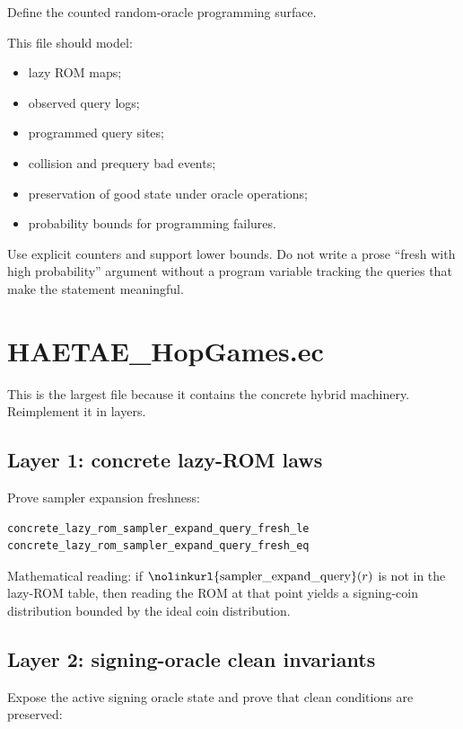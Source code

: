 \documentclass[11pt]{report}
\DeclareRobustCommand{\ec}[1]{\ifmmode\text{\nolinkurl{#1}}\else\nolinkurl{#1}\fi}
\theoremstyle{definition}
\theoremstyle{plain}
\begin{document}
Define the counted random-oracle programming surface.

This file should model:

\begin{itemize}
\item lazy ROM maps;
\item observed query logs;
\item programmed query sites;
\item collision and prequery bad events;
\item preservation of good state under oracle operations;
\item probability bounds for programming failures.
\end{itemize}

Use explicit counters and support lower bounds.  Do not write a prose
``fresh with high probability'' argument without a program variable tracking the
queries that make the statement meaningful.

\section{HAETAE\_HopGames.ec}

This is the largest file because it contains the concrete hybrid machinery.
Reimplement it in layers.

\subsection*{Layer 1: concrete lazy-ROM laws}

Prove sampler expansion freshness:

\begin{lstlisting}[language=EasyCrypt]
concrete_lazy_rom_sampler_expand_query_fresh_le
concrete_lazy_rom_sampler_expand_query_fresh_eq
\end{lstlisting}

Mathematical reading:
if \(\ec{sampler\_expand\_query}(r)\) is not in the lazy-ROM table, then reading
the ROM at that point yields a signing-coin distribution bounded by the ideal
coin distribution.

\subsection*{Layer 2: signing-oracle clean invariants}

Expose the active signing oracle state and prove that clean conditions are
preserved:
\end{document}
